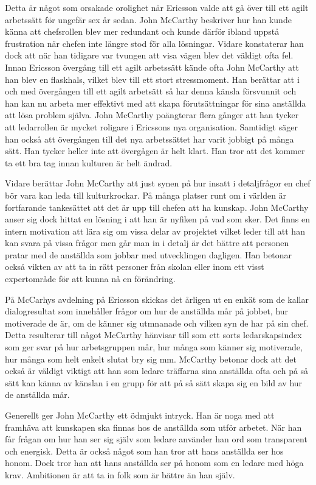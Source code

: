 Detta är något som orsakade orolighet när Ericsson valde att gå över till ett agilt arbetssätt för ungefär sex år sedan. John McCarthy beskriver hur han kunde känna att chefsrollen blev mer redundant och kunde därför ibland uppstå frustration när chefen inte längre stod för alla lösningar. Vidare konstaterar han dock att när han tidigare var tvungen att visa vägen blev det väldigt ofta fel. Innan Ericsson övergång till ett agilt arbetssätt kände ofta John McCarthy att han blev en flaskhals, vilket blev till ett stort stressmoment. Han berättar att i och med övergången till ett agilt arbetsätt så har denna känsla försvunnit och han kan nu arbeta mer effektivt med att skapa förutsättningar för sina anställda att lösa problem själva. John McCarthy poängterar flera gånger att han tycker att ledarrollen är mycket roligare i Ericssons nya organisation. Samtidigt säger han också att övergången till det nya arbetssättet har varit jobbigt på många sätt. Han tycker heller inte att övergågen är helt klart. Han tror att det kommer ta ett bra tag innan kulturen är helt ändrad.

Vidare berättar John McCarthy att just synen på hur insatt i detaljfrågor en chef bör vara kan leda till kulturkrockar. På många platser runt om i världen är fortfarande tankesättet att det är upp till chefen att ha kunskap. John McCarthy anser sig dock hittat en lösning i att han är nyfiken på vad som sker. Det finns en intern motivation att lära sig om vissa delar av projektet vilket leder till att han kan svara på vissa frågor men går man in i detalj är det bättre att personen pratar med de anställda som jobbar med utvecklingen dagligen. Han betonar också vikten av att ta in rätt personer från skolan eller inom ett visst expertområde för att kunna nå en förändring.

På McCarhys avdelning på Ericsson skickas det årligen ut en enkät som de kallar dialogresultat som innehåller frågor om hur de anställda mår på jobbet, hur motiverade de är, om de känner sig utmnanade och vilken syn de har på sin chef. Detta resulterar till något McCarthy hänvisar till som ett sorts ledarskapsindex som ger svar på hur arbetsgruppen mår, hur många som känner sig motiverade, hur många som helt enkelt slutat bry sig mm. McCarthy betonar dock att det också är väldigt viktigt att han som ledare träffarna sina anställda ofta och på så sätt kan känna av känslan i en grupp för att på så sätt skapa sig en bild av hur de anställda mår.

Generellt ger John McCarthy ett ödmjukt intryck. Han är noga med att framhäva att kunskapen ska finnas hos de anställda som utför arbetet. När han får frågan om hur han ser sig själv som ledare använder han ord som transparent och energisk. Detta är också något som han tror att hans anställda ser hos honom. Dock tror han att hans anställda ser på honom som en ledare med höga krav. Ambitionen är att ta in folk som är bättre än han själv.